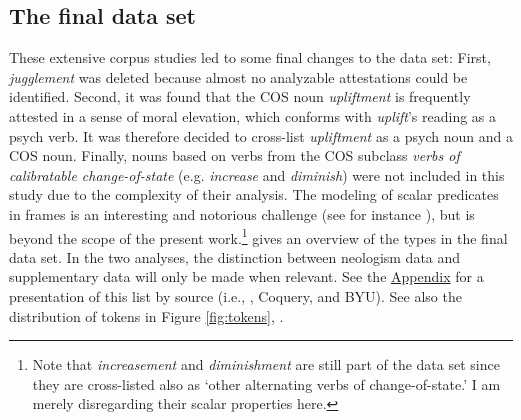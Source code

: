 \subsection{The final data set}
\label{sec:meth-revis-final}

These extensive corpus studies led to some final changes to the data set: 
First, \textit{jugglement} was deleted because almost no analyzable attestations could be identified.
Second, it was found that the COS noun \textit{upliftment} is frequently attested in a sense of moral elevation, which conforms with \textit{uplift}'s reading as a psych verb. It was therefore decided to cross-list \textit{upliftment} as a psych noun and a COS noun. Finally, nouns based on verbs from the COS subclass \textit{verbs of calibratable change-of-state} (e.g. \textit{increase} and \textit{diminish}) were not included in this study due to the complexity of their analysis. The modeling of scalar predicates in frames is an interesting and notorious challenge (see for instance \citealt{Gamerschlag.2014b, Zinova.2016}), but is beyond the scope of the present work.\footnote{Note that \textit{increasement} and \textit{diminishment} are still part of the data set since they are cross-listed also as `other alternating verbs of change-of-state.' I am merely disregarding their scalar properties here.} 
 gives an overview of the types in the final data set. In the two analyses, the distinction between neologism data and supplementary data will only be made when relevant. See the \hyperlink{Appendix}{Appendix} for a presentation of this list by source (i.e., , Coquery, and BYU). See also the distribution of tokens in Figure \ref{fig:tokens}, .

